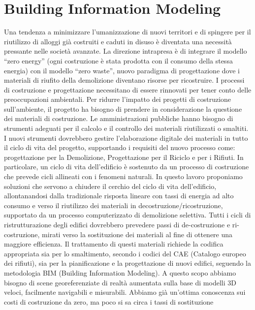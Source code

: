 \section{Building Information Modeling}
\label{sec:chapter_1_section_1}
\noindent

Una tendenza a minimizzare l'umanizzazione di nuovi territori e di spingere per il riutilizzo di alloggi
già costruiti e caduti in disuso è diventata una necessità pressante nelle società avanzate.
La direzione intrapresa è di integrare il modello ``zero energy'' (ogni costruzione è stata prodotta con il
consumo della stessa energia) con il modello ``zero waste'', nuovo paradigma di progettazione dove i materiali di
riufito della demolizione diventano risorse per ricostruire\cite{altamura:12}.
I processi di costruzione e progettazione necessitano di essere rinnovati per tener conto delle preoccupazioni
ambientali. Per ridurre l'impatto dei progetti di costruzione sull'ambiente, il progetto ha bisogno di prendere in
considerazione la questione dei materiali di costruzione.
Le amministrazioni pubbliche hanno bisogno di strumenti adeguati per il calcolo e il controllo dei materiali
riutilizzati o smaltiti.
I nuovi strumenti dovrebbero gestire l'elaborazione digitale dei materiali in tutto il ciclo di vita del progetto,
supportando i requisiti del nuovo processo come: progettazione per la Demolizione, Progettazione per il Riciclo e per i Rifiuti.
In particolare, un ciclo di vita dell'edificio è sostenuto da un processo di costruzione che prevede cicli allineati
con i fenomeni naturali.
In questo lavoro proponiamo soluzioni che servono a chiudere il cerchio del ciclo di vita dell'edificio, allontanandosi
dalla tradizionale risposta lineare con tassi di energia ad alto consumo e verso il riutilizzo
dei materiali in decostruzione/ricostruzione, supportato da un processo computerizzato di demolizione selettiva.
Tutti i cicli di ristrutturazione degli edifici dovrebbero prevedere passi di de-costruzione e ri-costruzione, mirati
verso la sostituzione dei materiali al fine di ottenere una maggiore efficienza. Il trattamento di questi materiali
richiede la codifica appropriata sia per lo smaltimento, secondo i codici del CAE (Catalogo europeo dei rifiuti),
sia per la pianificazione e la progettazione di nuovi edifici, seguendo la metodologia BIM (Building Information Modeling).
A questo scopo abbiamo bisogno di scene georeferenziate di realtà aumentata sulla base di modelli 3D veloci,
facilmente navigabili e misurabili.
Abbiamo già un'ottima conoscenza sui costi di costruzione da zero, ma poco si sa circa i tassi di sostituzione
